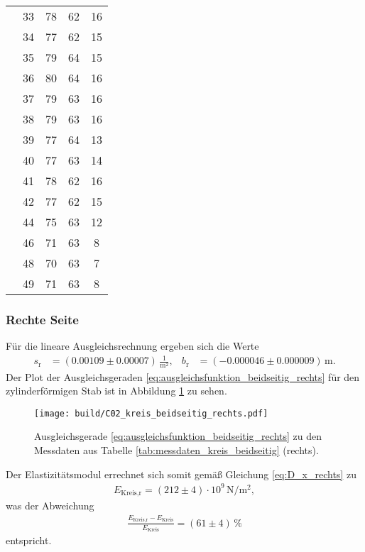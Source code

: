 \begin{table}[H]
\begin{tabular}[]{S S[table-format = 2.0] S S S[table-format = 2.0]}
                 & 33 & 78 & 62 & 16 \\
                 & 34 & 77 & 62 & 15 \\
                 & 35 & 79 & 64 & 15 \\
                 & 36 & 80 & 64 & 16 \\
                 & 37 & 79 & 63 & 16 \\
                 & 38 & 79 & 63 & 16 \\
                 & 39 & 77 & 64 & 13 \\
                 & 40 & 77 & 63 & 14 \\
                 & 41 & 78 & 62 & 16 \\
                 & 42 & 77 & 62 & 15 \\
                 & 44 & 75 & 63 & 12 \\
                 & 46 & 71 & 63 &  8 \\
                 & 48 & 70 & 63 &  7 \\
                 & 49 & 71 & 63 &  8 \\
        \bottomrule
    \end{tabular}
\end{table}

\subsubsection{Rechte Seite}
Für die lineare Ausgleichsrechnung ergeben sich die Werte
\begin{align*}
    s_\text{r} &= (\num{0.00109} \pm \num{0.00007}) \, \frac{1}{\unit{\meter^2}}, & 
    b_\text{r} &= (\num{-0.000046} \pm \num{0.000009}) \, \unit{\meter}.
\end{align*}
Der Plot der Ausgleichsgeraden \eqref{eq:ausgleichsfunktion_beidseitig_rechts} für den zylinderförmigen Stab
ist in Abbildung \ref{fig:plot_kreis_beidseitig_rechts} zu sehen.
%
\begin{figure}[H]
    \centering
    \texttt{[image: build/C02\_kreis\_beidseitig\_rechts.pdf]}
    \caption{Ausgleichsgerade \eqref{eq:ausgleichsfunktion_beidseitig_rechts} zu den Messdaten aus Tabelle \ref{tab:messdaten_kreis_beidseitig} (rechts).}
    \label{fig:plot_kreis_beidseitig_rechts}
\end{figure}

\noindent
Der Elastizitätsmodul errechnet sich somit gemäß Gleichung \eqref{eq:D_x_rechts} zu
\begin{align}
    E_\text{Kreis,r} = (\num{212} \pm \num{4}) \cdot 10^9 \, \unit{\newton\per\meter^2},
\end{align}
was der Abweichung
\begin{align*}
    \frac{E_\text{Kreis,r} - E_\text{Kreis}}{E_\text{Kreis}} = (\num{61} \pm \num{4}) \, \%
\end{align*}
entspricht.




